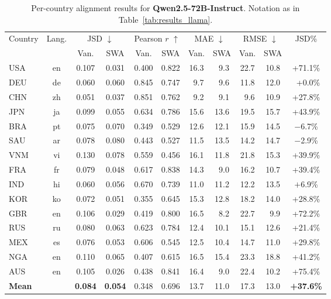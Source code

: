 \documentclass{article}
\begin{document}
\begin{table}[t]
\caption{Per-country alignment results for \textbf{Qwen2.5-72B-Instruct}.
    Notation as in Table~\ref{tab:results_llama}.}
\label{tab:results_qwen}
\centering
\setlength{\tabcolsep}{4pt}
\footnotesize
\begin{tabular}{lcccccccccc}
\toprule
\multirow{2}{*}{Country} & \multirow{2}{*}{Lang.}
  & \multicolumn{2}{c}{JSD $\downarrow$}
  & \multicolumn{2}{c}{Pearson $r$ $\uparrow$}
  & \multicolumn{2}{c}{MAE $\downarrow$}
  & \multicolumn{2}{c}{RMSE $\downarrow$}
  & JSD\% \\
\cmidrule(lr){3-4}\cmidrule(lr){5-6}\cmidrule(lr){7-8}\cmidrule(lr){9-10}
 & & Van. & SWA & Van. & SWA & Van. & SWA & Van. & SWA & \\
\midrule
USA & en    & 0.107 & 0.031 & 0.400 & 0.822 & 16.3 & ~9.3 & 22.7 & 10.8 & +71.1\% \\
DEU & de    & 0.060 & 0.060 & 0.845 & 0.747 & ~9.7 & ~9.6 & 11.8 & 12.0 & ~+0.0\% \\
CHN & zh    & 0.051 & 0.037 & 0.851 & 0.762 & ~9.2 & ~9.1 & ~9.6 & 10.9 & +27.8\% \\
JPN & ja    & 0.099 & 0.055 & 0.634 & 0.786 & 15.6 & 13.6 & 19.5 & 15.7 & +43.9\% \\
BRA & pt    & 0.075 & 0.070 & 0.349 & 0.529 & 12.6 & 12.1 & 15.9 & 14.5 & $-$6.7\% \\
SAU & ar    & 0.078 & 0.080 & 0.443 & 0.527 & 11.5 & 13.5 & 14.2 & 14.7 & $-$2.9\% \\
VNM & vi    & 0.130 & 0.078 & 0.559 & 0.456 & 16.1 & 11.8 & 21.8 & 15.3 & +39.9\% \\
FRA & fr    & 0.079 & 0.048 & 0.617 & 0.838 & 14.3 & ~9.0 & 16.2 & 10.7 & +39.4\% \\
IND & hi    & 0.060 & 0.056 & 0.670 & 0.739 & 11.0 & 11.2 & 12.2 & 13.5 & $+$6.9\% \\
KOR & ko    & 0.072 & 0.051 & 0.355 & 0.645 & 15.3 & 12.8 & 18.2 & 14.0 & +28.8\% \\
GBR & en    & 0.106 & 0.029 & 0.419 & 0.800 & 16.5 & ~8.2 & 22.7 & ~9.9 & +72.2\% \\
RUS & ru    & 0.080 & 0.063 & 0.623 & 0.784 & 12.4 & 10.1 & 15.1 & 12.6 & +21.4\% \\
MEX & es    & 0.076 & 0.053 & 0.606 & 0.545 & 12.5 & 10.4 & 14.7 & 11.0 & +29.8\% \\
NGA & en    & 0.110 & 0.065 & 0.407 & 0.615 & 16.5 & 15.4 & 23.3 & 18.8 & +41.2\% \\
AUS & en    & 0.105 & 0.026 & 0.438 & 0.841 & 16.4 & ~9.0 & 22.4 & 10.2 & +75.4\% \\
\midrule
\textbf{Mean} & & \textbf{0.084} & \textbf{0.054} & 0.348 & 0.696 & 13.7 & 11.0 & 17.3 & 13.0 & \textbf{+37.6\%} \\
\bottomrule
\end{tabular}
\end{table}
\end{document}
